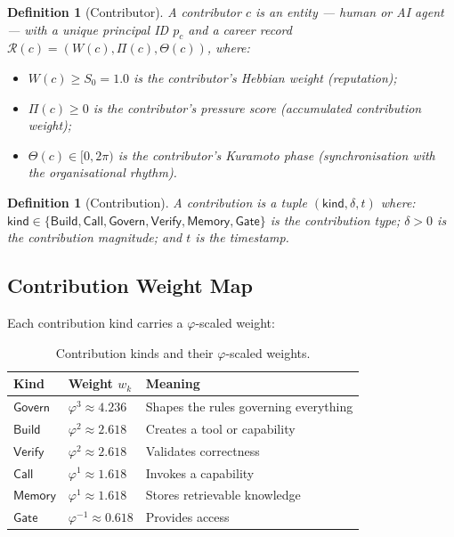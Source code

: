 \documentclass[12pt]{article}
\newtheorem{definition}[theorem]{Definition}
\newcommand{\PHI}{\varphi}
\newcommand{\PHIINV}{\varphi^{-1}}
\newcommand{\contrib}[1]{\mathsf{#1}}
\begin{document}
\begin{definition}[Contributor]
  A \emph{contributor} $c$ is an entity — human or AI agent — with a unique
  principal ID $p_c$ and a career record $\mathcal{R}(c) = (W(c), \Pi(c),
  \Theta(c))$, where:
  \begin{itemize}[leftmargin=*]
    \item $W(c) \ge S_0 = 1.0$ is the contributor's \emph{Hebbian weight}
      (reputation);
    \item $\Pi(c) \ge 0$ is the contributor's \emph{pressure score}
      (accumulated contribution weight);
    \item $\Theta(c) \in [0, 2\pi)$ is the contributor's \emph{Kuramoto phase}
      (synchronisation with the organisational rhythm).
  \end{itemize}
\end{definition}

\begin{definition}[Contribution]
  A \emph{contribution} is a tuple $(\contrib{kind}, \delta, t)$ where:
  $\contrib{kind} \in \{\mathsf{Build}, \mathsf{Call}, \mathsf{Govern},
  \mathsf{Verify}, \mathsf{Memory}, \mathsf{Gate}\}$ is the contribution type;
  $\delta > 0$ is the contribution magnitude; and $t$ is the timestamp.
\end{definition}

\subsection{Contribution Weight Map}

Each contribution kind carries a $\PHI$-scaled weight:

\begin{table}[h]
  \centering
  \caption{Contribution kinds and their $\PHI$-scaled weights.}
  \label{tab:contrib}
  \begin{tabular}{lll}
    \toprule
    Kind & Weight $w_k$ & Meaning \\
    \midrule
    $\contrib{Govern}$ & $\PHI^3 \approx 4.236$ & Shapes the rules governing everything \\
    $\contrib{Build}$  & $\PHI^2 \approx 2.618$ & Creates a tool or capability \\
    $\contrib{Verify}$ & $\PHI^2 \approx 2.618$ & Validates correctness \\
    $\contrib{Call}$   & $\PHI^1 \approx 1.618$ & Invokes a capability \\
    $\contrib{Memory}$ & $\PHI^1 \approx 1.618$ & Stores retrievable knowledge \\
    $\contrib{Gate}$   & $\PHIINV \approx 0.618$ & Provides access \\
    \bottomrule
  \end{tabular}
\end{table}
\end{document}
